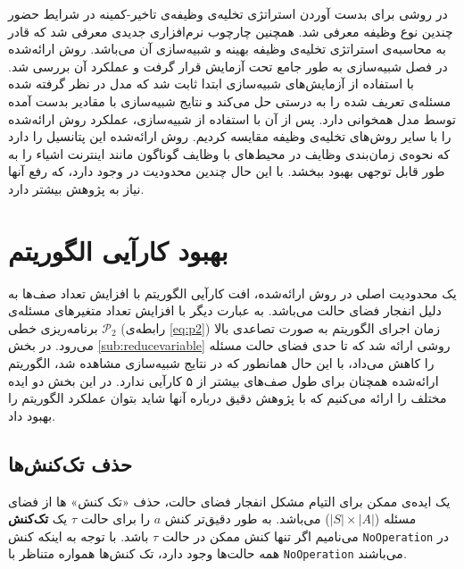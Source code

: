 در \CurrentProject روشی برای بدست آوردن استراتژی تخلیه‌ی وظیفه‌ی تاخیر-کمینه در شرایط حضور چندین نوع وظیفه معرفی شد. همچنین چارچوب نرم‌افزاری جدیدی معرفی شد که قادر به محاسبه‌ی استراتژی تخلیه‌ی وظیفه بهینه و شبیه‌سازی آن می‌باشد. روش ارائه‌شده در فصل شبیه‌سازی به طور جامع تحت آزمایش قرار گرفت و عملکرد آن بررسی شد. با استفاده از آزمایش‌های شبیه‌سازی ابتدا ثابت شد که مدل در نظر گرفته شده مسئله‌ی تعریف شده را به درستی حل می‌کند و نتایج شبیه‌سازی با مقادیر بدست آمده توسط مدل همخوانی دارد. پس از آن با استفاده از شبیه‌سازی، عملکرد روش ارائه‌شده را با سایر روش‌های تخلیه‌ی وظیفه مقایسه کردیم. روش ارائه‌شده این پتانسیل را دارد که نحوه‌ی زمان‌بندی وظایف در محیط‌های با وظایف گوناگون مانند اینترنت اشیاء را به طور قابل توجهی بهبود ببخشد. با این حال چندین محدودیت در \CurrentProject وجود دارد، که رفع آنها نیاز به پژوهش بیشتر دارد. 

\section{بهبود کارآیی الگوریتم}
یک محدودیت اصلی در روش ارائه‌شده، افت کارآیی الگوریتم با افزایش تعداد صف‌ها به دلیل انفجار فضای حالت می‌باشد. به عبارت دیگر با افزایش تعداد متغیرهای مسئله‌ی برنامه‌ریزی خطی
$\mathcal{P}_2$
(رابطه‌ی \ref{eq:p2}) زمان اجرای الگوریتم به صورت تصاعدی بالا می‌رود. در بخش \ref{sub:reducevariable} روشی ارائه شد که تا حدی فضای حالت مسئله را کاهش می‌داد، با این حال همانطور که در نتایج شبیه‌سازی مشاهده شد، الگوریتم ارائه‌شده همچنان برای طول صف‌های بیشتر از ۵ کارآیی ندارد. در این بخش دو ایده مختلف را ارائه می‌کنیم که با پژوهش دقیق درباره آنها شاید بتوان عملکرد الگوریتم را بهبود داد.
\subsection{حذف تک‌کنش‌ها}
یک ایده‌ی ممکن برای التیام مشکل انفجار فضای حالت، حذف «تک کنش» ها از فضای مسئله ($|S| \times |A|$) می‌باشد. به طور دقیق‌تر کنش $a$ را برای حالت $\tau$ یک \textbf{تک‌کنش} می‌نامیم اگر تنها کنش ممکن در حالت $\tau$ باشد. با توجه به اینکه کنش \texttt{\footnotesize NoOperation} در همه حالت‌ها وجود دارد، تک کنش‌ها همواره متناظر با \texttt{\footnotesize NoOperation} می‌باشند. \\

